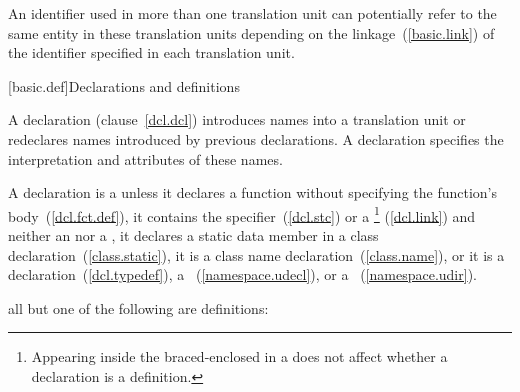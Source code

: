 \pnum
{}%
%
An identifier used in more than one translation unit can potentially
refer to the same entity in these translation units depending on the
linkage~(\ref{basic.link}) of the identifier specified in each
translation unit.

[basic.def]{Declarations and definitions}

\pnum
{}%
%
%
A declaration (clause~\ref{dcl.dcl}) introduces names into a translation
unit or redeclares names introduced by previous declarations.
A declaration specifies the interpretation and attributes of these names.

\pnum
{}%
%
A declaration is a  unless it declares a function
without specifying the function's body~(\ref{dcl.fct.def}), it contains
the
%
 specifier~(\ref{dcl.stc}) or a
\footnote{Appearing inside the braced-enclosed
 in a  does
not affect whether a declaration is a definition.}
(\ref{dcl.link}) and neither an  nor a
,
%
it declares a static data member in a class
declaration~(\ref{class.static}),
%
it is a class name declaration~(\ref{class.name}),
or it is a
%
 declaration~(\ref{dcl.typedef}),
a
~(\ref{namespace.udecl}),
or a ~(\ref{namespace.udir}).

\pnum
\enterexample all but one of the following are definitions:


